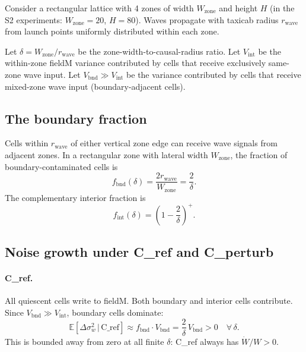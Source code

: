 \documentclass[11pt,a4paper]{article}
\newcommand{\sw}{\sigma_w}
\newcommand{\fint}{f_{\mathrm{int}}}
\begin{document}
Consider a rectangular lattice with 4 zones of width $W_\mathrm{zone}$ and height $H$
(in the S2 experiments: $W_\mathrm{zone}=20$, $H=80$).
Waves propagate with taxicab radius $r_\mathrm{wave}$ from launch points
uniformly distributed within each zone.

Let $\delta = W_\mathrm{zone}/r_\mathrm{wave}$ be the zone-width-to-causal-radius ratio.
Let $V_\mathrm{int}$ be the within-zone fieldM variance contributed by cells that
receive exclusively same-zone wave input.
Let $V_\mathrm{bnd} \gg V_\mathrm{int}$ be the variance contributed by cells that
receive mixed-zone wave input (boundary-adjacent cells).

\subsection{The boundary fraction}

Cells within $r_\mathrm{wave}$ of either vertical zone edge can receive wave signals
from adjacent zones. In a rectangular zone with lateral width $W_\mathrm{zone}$,
the fraction of boundary-contaminated cells is
\begin{equation}
  f_\mathrm{bnd}(\delta) = \frac{2r_\mathrm{wave}}{W_\mathrm{zone}}
    = \frac{2}{\delta}.
  \label{eq:fbnd}
\end{equation}
The complementary interior fraction is
\begin{equation}
  \fint(\delta) = \left(1 - \frac{2}{\delta}\right)^+.
  \label{eq:fint}
\end{equation}

\subsection{Noise growth under C\_ref and C\_perturb}

\paragraph{C\_ref.}
All quiescent cells write to fieldM. Both boundary and interior cells contribute.
Since $V_\mathrm{bnd} \gg V_\mathrm{int}$, boundary cells dominate:
\begin{equation}
  \mathbb{E}[\Delta\sw^2 \,|\, \text{C\_ref}]
    \approx f_\mathrm{bnd} \cdot V_\mathrm{bnd}
    = \frac{2}{\delta}\,V_\mathrm{bnd} > 0 \quad \forall\,\delta.
\end{equation}
This is bounded away from zero at all finite $\delta$: C\_ref always has $\dot{W}/W > 0$.
\end{document}
